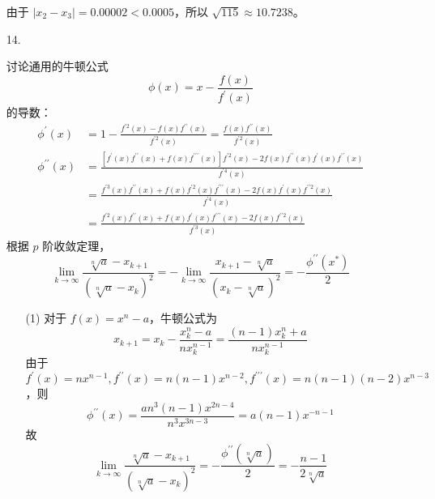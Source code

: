 \documentclass{sjtuarticle}
\begin{document}
\begin{itemize}
\begin{solution}
        由于 $|x_2-x_3|=0.00002<0.0005$，所以 $\sqrt{115}\approx 10.7238$。
    \end{solution}
    \item[14.] \begin{solution}
            讨论通用的牛顿公式
            \begin{equation*}
                \phi(x)=x-\frac{f(x)}{f^\prime(x)}
            \end{equation*}
            的导数：
            \begin{align*}
                \phi^\prime (x)&=1-\frac{f^{\prime 2}(x)-f(x)f^{\prime\prime}(x)}{f^{\prime 2}(x)}=\frac{f(x)f^{\prime\prime}(x)}{f^{\prime 2}(x)}\\
                \phi^{\prime\prime} (x)&=\frac{[f^\prime(x)f^{\prime\prime}(x)+f(x)f^{\prime\prime\prime}(x)]f^{\prime 2}(x)-2f(x)f^{\prime\prime}(x)f^\prime(x)f^{\prime\prime}(x)}{f^{\prime 4}(x)}\\
                &=\frac{f^{\prime 3}(x)f^{\prime\prime}(x)+f(x)f^{\prime 2}(x)f^{\prime\prime\prime}(x)-2f(x)f^\prime(x)f^{\prime\prime 2}(x)}{f^{\prime 4}(x)}\\
                &=\frac{f^{\prime 2}(x)f^{\prime\prime}(x)+f(x)f^{\prime}(x)f^{\prime\prime\prime}(x)-2f(x)f^{\prime\prime 2}(x)}{f^{\prime 3}(x)}
            \end{align*}
            根据 $p$ 阶收敛定理，
            \begin{equation*}
                \lim_{k\rightarrow \infty}\frac{\sqrt[n]{a}-x_{k+1}}{(\sqrt[n]{a}-x_k)^2}=-\lim_{k\rightarrow \infty}\frac{x_{k+1}-\sqrt[n]{a}}{(x_k-\sqrt[n]{a})^2}=-\frac{\phi^{\prime\prime}(x^*)}{2}
            \end{equation*}
        \begin{itemize}
            \item[(1)] 对于 $f(x)=x^n-a$，牛顿公式为
            \begin{equation*}
                x_{k+1}=x_k-\frac{x_k^n-a}{nx_k^{n-1}}=\frac{(n-1)x_k^n+a}{nx_k^{n-1}}
            \end{equation*}
            由于 $f^\prime(x)=nx^{n-1},f^{\prime\prime}(x)=n(n-1)x^{n-2},f^{\prime\prime\prime}(x)=n(n-1)(n-2)x^{n-3}$，则
            \begin{equation*}
                \phi^{\prime\prime} (x)=\frac{an^3(n-1)x^{2n-4}}{n^3x^{3n-3}}=a(n-1)x^{-n-1}
            \end{equation*}
            故
            \begin{equation*}
                \lim_{k\rightarrow \infty}\frac{\sqrt[n]{a}-x_{k+1}}{(\sqrt[n]{a}-x_k)^2}=-\frac{\phi^{\prime\prime}(\sqrt[n]{a})}{2}=-\frac{n-1}{2\sqrt[n]{a}}

\end{equation*}
\end{itemize}
\end{solution}
\end{itemize}
\end{document}
